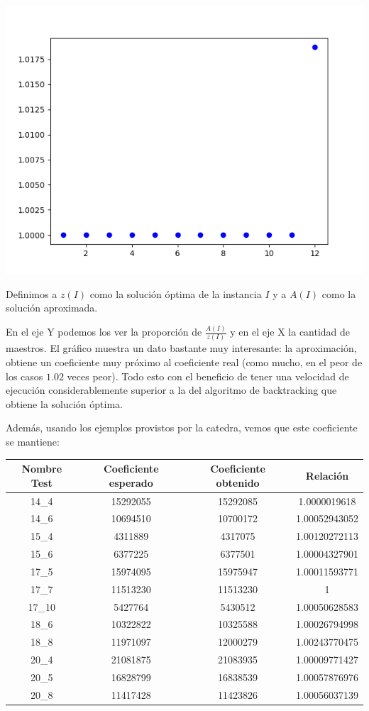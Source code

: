 \documentclass{article}
\begin{document}
\includegraphics[scale=0.60]{images/coeficientesAprox.png}

Definimos a $z(I)$ como la solución óptima de la instancia $I$ y a $A(I)$ como la solución aproximada.

En el eje Y podemos los ver la proporción de $\frac{A(I)}{z(I)}$ y en el eje X la cantidad de maestros.
El gráfico muestra un dato bastante muy interesante: la aproximación, obtiene un coeficiente muy próximo al coeficiente real (como mucho, en el peor de los casos $1.02$ veces peor). Todo esto con el beneficio de tener una velocidad de ejecución considerablemente superior a la del algoritmo de backtracking que obtiene la solución óptima.

Además, usando los ejemplos provistos por la catedra, vemos que este coeficiente se mantiene:

\begin{center}
\begin{tabular}{ |c|c|c|c| } 
 \hline
 Nombre Test & Coeficiente esperado & Coeficiente obtenido & Relación \\ 
 \hline
  14\_4 & 15292055  & 15292085 & 1.0000019618 \\
 \hline
  14\_6 & 10694510  & 10700172 & 1.00052943052 \\
 \hline
  15\_4 & 4311889   & 4317075  & 1.00120272113 \\
 \hline
  15\_6 & 6377225   & 6377501  & 1.00004327901 \\
 \hline
  17\_5 & 15974095  & 15975947 & 1.00011593771 \\
 \hline
  17\_7 & 11513230  & 11513230 & 1 \\
 \hline
  17\_10 & 5427764  & 5430512  & 1.00050628583 \\
 \hline
  18\_6 & 10322822  & 10325588 & 1.00026794998 \\
 \hline
  18\_8 & 11971097  & 12000279 & 1.00243770475 \\
 \hline
  20\_4 & 21081875  & 21083935 & 1.00009771427 \\
 \hline
  20\_5 & 16828799  & 16838539 & 1.00057876976 \\
 \hline
  20\_8 & 11417428  & 11423826 & 1.00056037139 \\
  \hline
\end{tabular}
\end{center}
\end{document}

